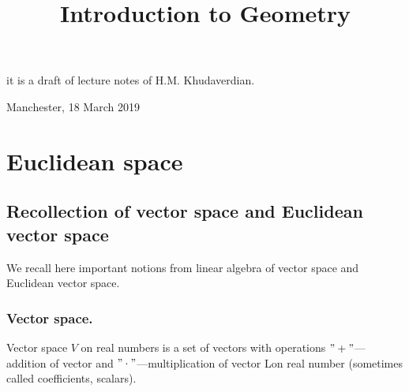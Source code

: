 \documentclass[12pt]{article}
\title{Introduction to  Geometry}
\date{}
\numberwithin{equation}{section}
\begin{document}
\maketitle

  \centerline {it is a draft of lecture notes of H.M. Khudaverdian.}

  \centerline { Manchester, 18 March 2019}

\tableofcontents
{}

\newpage
\section {Euclidean space}

\subsection{Recollection of vector space and Euclidean vector
space}

We recall here important notions from linear algebra
of vector space and Euclidean vector space.


\subsubsection {Vector space.}


\bigskip

Vector space $V$ on real numbers is a set of 
vectors with operations
$"+"$---addition of vector and 
$"\cdot"$---multiplication of vector
Lon real number (sometimes called coefficients, scalars). 

\m
\end{document}
